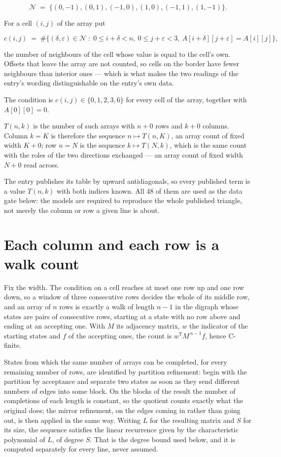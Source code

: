 \documentclass[11pt]{article}
\theoremstyle{definition}
\begin{document}
\[\mathcal{N} \;=\; \{(0,-1), (0,1), (-1,0), (1,0), (-1,1), (1,-1)\}.\]

For a cell $(i,j)$ of the array put

\[c(i,j) \;=\; \#\bigl\{(\delta,\varepsilon)\in\mathcal{N} \;:\; 0\le i+\delta<n,\ 0\le j+\varepsilon<3,\ A[i+\delta][j+\varepsilon] = A[i][j]\bigr\},\]

the number of neighbours of the cell whose value is equal to the cell's own. Offsets that leave the array are not counted, so cells on the border have fewer neighbours than interior ones --- which is what makes the two readings of the entry's wording distinguishable on the entry's own data.

The condition is $c(i,j) \in \{0, 1, 2, 3, 6\}$ for every cell of the array, together with $A[0][0]=0$.

$T(n,k)$ is the number of such arrays with $n + 0$ rows and $k + 0$ columns. Column $k = K$ is therefore the sequence $n \mapsto T(n,K)$, an array count of fixed width $K + 0$; row $n = N$ is the sequence $k \mapsto T(N,k)$, which is the same count with the roles of the two directions exchanged --- an array count of fixed width $N + 0$ read across.

The entry publishes its table by upward antidiagonals, so every published term is a value $T(n,k)$ with both indices known. All 48 of them are used as the data gate below: the models are required to reproduce the whole published triangle, not merely the column or row a given line is about.

\section{Each column and each row is a walk count}

Fix the width. The condition on a cell reaches at most one row up and one row down, so a window of three consecutive rows decides the whole of its middle row, and an array of $n$ rows is exactly a walk of length $n-1$ in the digraph whose states are pairs of consecutive rows, starting at a state with no row above and ending at an accepting one. With $M$ its adjacency matrix, $w$ the indicator of the starting states and $f$ of the accepting ones, the count is $w^{\mathsf T}M^{\,n-1}f$, hence C-finite.

States from which the same number of arrays can be completed, for every remaining number of rows, are identified by partition refinement: begin with the partition by acceptance and separate two states as soon as they send different numbers of edges into some block. On the blocks of the result the number of completions of each length is constant, so the quotient counts exactly what the original does; the mirror refinement, on the edges coming in rather than going out, is then applied in the same way. Writing $L$ for the resulting matrix and $S$ for its size, the sequence satisfies the linear recurrence given by the characteristic polynomial of $L$, of degree $S$. That is the degree bound used below, and it is computed separately for every line, never assumed.
\end{document}
